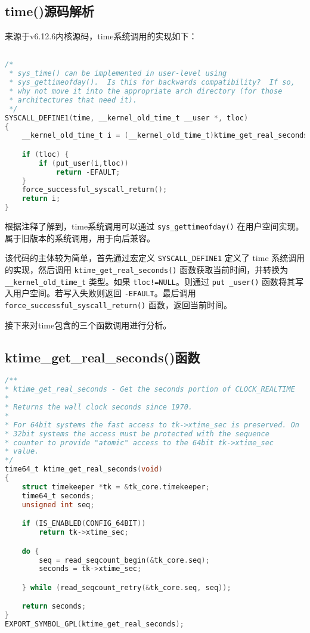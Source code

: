 \documentclass[12pt,hyperref,a4paper,UTF8]{ctexart}
\begin{document}
\subsection{time()源码解析}
来源于v6.12.6内核源码\cite{linux_kernel_6_12_6}，time系统调用的实现如下：
\begin{lstlisting}[language=C, caption=time() in time.c, label=time]

/*
 * sys_time() can be implemented in user-level using
 * sys_gettimeofday().  Is this for backwards compatibility?  If so,
 * why not move it into the appropriate arch directory (for those
 * architectures that need it).
 */
SYSCALL_DEFINE1(time, __kernel_old_time_t __user *, tloc)
{
    __kernel_old_time_t i = (__kernel_old_time_t)ktime_get_real_seconds();

    if (tloc) {
        if (put_user(i,tloc))
            return -EFAULT;
    }
    force_successful_syscall_return();
    return i;
}

\end{lstlisting}
\sloppy

根据注释了解到，time系统调用可以通过 \lstinline|sys_gettimeofday()| 在用户空间实现。属于旧版本的系统调用，用于向后兼容。

该代码的主体较为简单，首先通过宏定义 \lstinline|SYSCALL_DEFINE1| 定义了 time 系统调用的实现，然后调用 \lstinline|ktime_get_real_seconds()| 函数获取当前时间，并转换为 \lstinline|__kernel_old_time_t| 类型。如果 \lstinline|tloc!=NULL|。则通过 \lstinline|put _user()| 函数将其写入用户空间。若写入失败则返回 \lstinline|-EFAULT|。最后调用 \lstinline|force_successful_syscall_return()| 函数，返回当前时间。

接下来对time包含的三个函数调用进行分析。

\subsection{ktime\_get\_real\_seconds()函数}


\begin{lstlisting}[language=C, caption=ktime\_get\_real\_seconds() in timekeeping.c, label=ktime_get_real_seconds]
/**
* ktime_get_real_seconds - Get the seconds portion of CLOCK_REALTIME
*
* Returns the wall clock seconds since 1970.
*
* For 64bit systems the fast access to tk->xtime_sec is preserved. On
* 32bit systems the access must be protected with the sequence
* counter to provide "atomic" access to the 64bit tk->xtime_sec
* value.
*/
time64_t ktime_get_real_seconds(void)
{
    struct timekeeper *tk = &tk_core.timekeeper;
    time64_t seconds;
    unsigned int seq;

    if (IS_ENABLED(CONFIG_64BIT))
        return tk->xtime_sec;

    do {
        seq = read_seqcount_begin(&tk_core.seq);
        seconds = tk->xtime_sec;

    } while (read_seqcount_retry(&tk_core.seq, seq));

    return seconds;
}
EXPORT_SYMBOL_GPL(ktime_get_real_seconds);
\end{lstlisting}
\end{document}
